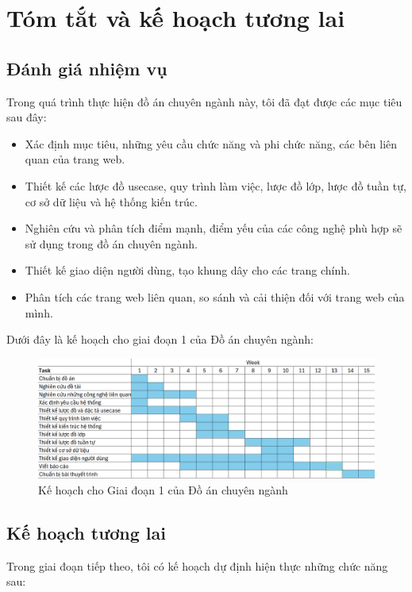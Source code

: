 \chapter{Tóm tắt và kế hoạch tương lai}

\section{Đánh giá nhiệm vụ}

Trong quá trình thực hiện đồ án chuyên ngành này, tôi đã đạt được các mục tiêu sau đây:

\begin{itemize}
	\item Xác định mục tiêu, những yêu cầu chức năng và phi chức năng, các bên liên quan của trang web.
	\item Thiết kế các lược đồ usecase, quy trình làm việc, lược đồ lớp, lược đồ tuần tự, cơ sở dữ liệu và hệ thống kiến trúc.
	\item Nghiên cứu và phân tích điểm mạnh, điểm yếu của các công nghệ phù hợp sẽ sử dụng trong đồ án chuyên ngành.
	\item Thiết kế giao diện người dùng, tạo khung dây cho các trang chính.
	\item Phân tích các trang web liên quan, so sánh và cải thiện đối với trang web của mình.
\end{itemize}
\newpage
Dưới đây là kế hoạch cho giai đoạn 1 của Đồ án chuyên ngành:

\begin{figure}[H]
	\centering
	\includegraphics[scale=0.35]{img/TKB_GD1.png}
	\caption{Kế hoạch cho Giai đoạn 1 của Đồ án chuyên ngành}
\end{figure}


\section{Kế hoạch tương lai}

Trong giai đoạn tiếp theo, tôi có kế hoạch dự định hiện thực những chức năng sau:

